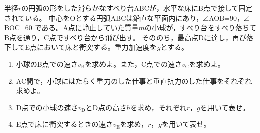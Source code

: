\item
    \begin{mawarikomi}{150pt}{}
        半径$r$の円弧の形をした滑らかなすべり台ABCが，水平な床にB点で接して固定されている。
        中心をOとする円弧ABCは鉛直な平面内にあり，$\angle $AOB=90\Deg ，$\angle $BOC=60\Deg
        である。A点に静止していた質量$m$の小球が，すべり台をすべり落ちてB点を通り，C点ですべり台から飛び出す。
        そののち，最高点Dに達し，再び落下してE点において床と衝突する。重力加速度を$g$とする。
        \begin{enumerate}
            \item 小球のB点での速さ$v_\mathrm{B}$を求めよ。また，C点での速さ$v_\mathrm{C}$を求めよ。
            \item AC間で，小球にはたらく重力のした仕事と垂直抗力のした仕事をそれぞれ求めよ。
            \item D点での小球の速さ$v_\mathrm{D}$とD点の高さ$h$を求め，それぞれ$r$，$g$を用いて表せ。
            \item E点で床に衝突するときの速さ$v_\mathrm{E}$を求め，$r$，$g$を用いて表せ。
        \end{enumerate}
    \end{mawarikomi}